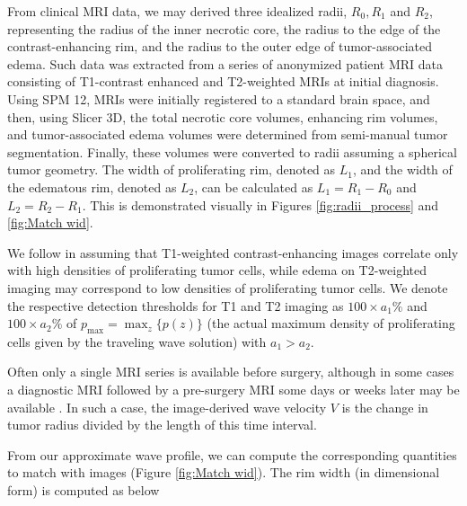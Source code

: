 \documentclass{aims}
\numberwithin{equation}{section}
\begin{document}
From clinical MRI data, we may derived three idealized radii, $R_{0},R_{1}$ and $R_{2}$, representing the radius of the inner necrotic core, the radius to the edge of the contrast-enhancing rim, and the radius to the outer edge of tumor-associated edema.  Such data was extracted from a series of anonymized patient MRI data consisting of T1-contrast enhanced and T2-weighted MRIs at initial diagnosis.  Using SPM 12, MRIs were initially registered to a standard brain space, and then, using Slicer 3D, the total necrotic core volumes, enhancing rim volumes, and tumor-associated edema volumes were determined from semi-manual tumor segmentation.  Finally, these volumes were converted to radii assuming a spherical tumor geometry.  The width of proliferating rim, denoted as $L_{1}$, and the width of the edematous rim, denoted as $L_{2}$, can be calculated as $L_{1}=R_{1}-R_{0}$ and $L_{2}=R_{2}-R_{1}$.  This is demonstrated visually in Figures \ref{fig:radii_process} and \ref{fig:Match wid}.

We follow \cite{Swanson2008} in assuming that T1-weighted contrast-enhancing images correlate only with high densities of proliferating tumor cells, while edema on T2-weighted imaging may correspond to low densities of proliferating tumor cells.  We denote the respective detection thresholds for T1 and T2 imaging as $100\times a_{1}\%$ and $100\times a_{2}\%$ of $p_{\max}=\max_{z}\{p(z)\}$ (the actual
maximum density of proliferating cells given by the traveling wave
solution) with $a_{1}>a_{2}$.

Often only a single MRI series is available before surgery, although in some cases a diagnostic MRI followed by a pre-surgery MRI some days or weeks later may be available \cite{Swanson2008}.  In such a case, the
image-derived wave velocity $V$ is the change in tumor radius divided
by the length of this time interval.

From our approximate wave profile, we can compute the corresponding
quantities to match with images (Figure \ref{fig:Match wid}). The
rim width (in dimensional form) is computed as below
\end{document}
